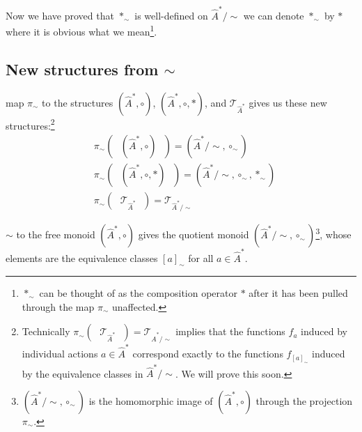 \begin{notation}
    Now we have proved that $\ast_{\sim}$ is well-defined on $\hat{A}^{\ast}/\sim$ we can denote $\ast_{\sim}$ by $\ast$ where it is obvious what we mean\footnote{
    $\ast_{\sim}$ can be thought of as the composition operator $\ast$ after it has been pulled through the map $\pi_{\sim}$ unaffected.
    }.
\end{notation}


\subsection{New structures from $\sim$}

 map $\pi_{\sim}$ to the structures $(\hat{A}^{\ast}, \circ)$, $(\hat{A}^{\ast}, \circ, \ast)$, and $\mathcal{T}_{\hat{A}^{\ast}}$ gives us these new structures:\footnote{
    Technically $\pi_{\sim}(\text{ }\mathcal{T}_{\hat{A}^{\ast}}\text{ }) = \mathcal{T}_{\hat{A}^{\ast}/\sim}$ implies that the functions $f_{a}$ induced by individual actions $a \in \hat{A}^{\ast}$ correspond exactly to the functions $f_{[a]_{\sim}}$ induced by the equivalence classes in $\hat{A}^{\ast}/\sim$.
    We will prove this soon.
}
\begin{align}
	 & \pi_{\sim}(\text{ }(\hat{A}^{\ast}, \circ)\text{ }) = (\hat{A}^{\ast}/\sim, \circ_{\sim})                    \\
	 & \pi_{\sim}(\text{ }(\hat{A}^{\ast}, \circ, \ast)\text{ }) = (\hat{A}^{\ast}/\sim, \circ_{\sim}, \ast_{\sim}) \\
	 & \pi_{\sim}(\text{ }\mathcal{T}_{\hat{A}^{\ast}}\text{ }) = \mathcal{T}_{\hat{A}^{\ast}/\sim}
\end{align}


 $\sim$ to the free monoid $(\hat{A}^{\ast}, \circ)$ gives the quotient monoid $(\hat{A}^{\ast}/\sim, \circ_{\sim})$\footnote{
	$(\hat{A}^{\ast}/\sim, \circ_{\sim})$ is the homomorphic image of $(\hat{A}^{\ast}, \circ)$ through the projection $\pi_{\sim}$.
}, whose elements are the equivalence classes $[a]_{\sim}$ for all $a \in \hat{A}^{\ast}$.

